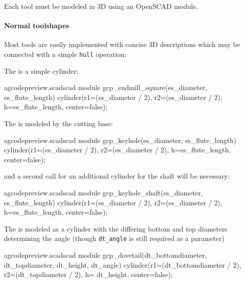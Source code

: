\documentclass{ltxdoc}
\begin{document}
Each tool must be modeled in 3D using an OpenSCAD module. 

\paragraph{Normal toolshapes}
Most tools are easily implemented with concise 3D descriptions which may be connected with
a simple \texttt{hull} operation:

The  is a simple cylinder:
\lstset{firstnumber=\thegcpscad}
\begin{writecode}{a}{gcodepreview.scad}{scad}
module gcp_endmill_square(es_diameter, es_flute_length) {
  cylinder(r1=(es_diameter / 2), r2=(es_diameter / 2), h=es_flute_length, center=false);
}

\end{writecode}
\addtocounter{gcpscad}{4}

\begin{samepage}
The  is modeled by the cutting base:

\lstset{firstnumber=\thegcpscad}
\begin{writecode}{a}{gcodepreview.scad}{scad}
module gcp_keyhole(es_diameter, es_flute_length) {
  cylinder(r1=(es_diameter / 2), r2=(es_diameter / 2), h=es_flute_length, center=false);
}

\end{writecode}
\addtocounter{gcpscad}{4}

\noindent and a second call for an additional cylinder for the shaft will be necessary:

\lstset{firstnumber=\thegcpscad}
\begin{writecode}{a}{gcodepreview.scad}{scad}
module gcp_keyhole_shaft(es_diameter, es_flute_length) {
  cylinder(r1=(es_diameter / 2), r2=(es_diameter / 2), h=es_flute_length, center=false);
}

\end{writecode}
\addtocounter{gcpscad}{4}
\end{samepage}

The  is modeled as a cylinder with the differing bottom and 
top diameters determining the angle (though \verb|dt_angle| is still required 
as a parameter)

\lstset{firstnumber=\thegcpscad}
\begin{writecode}{a}{gcodepreview.scad}{scad}
module gcp_dovetail(dt_bottomdiameter, dt_topdiameter, dt_height, dt_angle) {
  cylinder(r1=(dt_bottomdiameter / 2), r2=(dt_topdiameter / 2), h= dt_height, center=false);
}

\end{writecode}
\addtocounter{gcpscad}{4}
\end{document}
